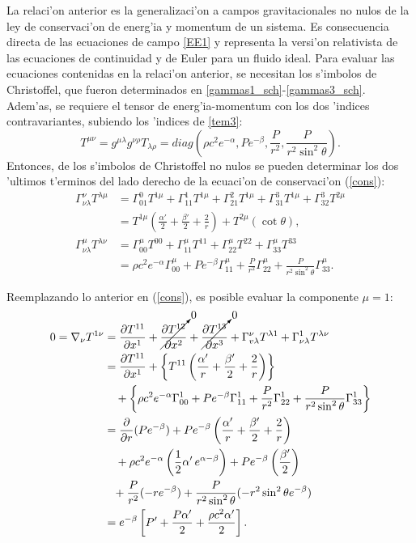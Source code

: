 La relaci'on anterior es la generalizaci'on a campos gravitacionales no nulos de la ley de conservaci'on de energ'ia y momentum de un sistema. Es consecuencia directa de las ecuaciones de campo \eqref{EE1} y representa la versi'on relativista de las ecuaciones de continuidad y de Euler para un fluido ideal. Para evaluar las ecuaciones contenidas en la relaci'on anterior, se necesitan los s'imbolos de Christoffel, que fueron determinados en \eqref{gammas1_sch}-\eqref{gammas3_sch}. Adem'as, se requiere el tensor de energ'ia-momentum con los dos 'indices contravariantes, subiendo los 'indices de \eqref{tem3}:
\begin{equation}
 T^{\mu\nu}=g^{\mu\lambda}g^{\nu\rho}T_{\lambda\rho}=diag\left(\rho c^2 e^{-\alpha},P e^{-\beta},\frac{P}{r^2}, \frac{P}{r^2\sin^2\theta}\right).
\end{equation}
Entonces, de los s'imbolos de Christoffel no nulos se pueden determinar los dos 'ultimos t'erminos del lado derecho de la ecuaci'on de conservaci'on (\ref{cons}):
\begin{align}
 \Gamma^{\nu}_{\nu\lambda}T^{\lambda\mu}&=\Gamma_{01}^{0}T^{1\mu}+\Gamma_{11}^{1}T^{1\mu}+\Gamma_{21}^{2}T^{1\mu}+\Gamma_{31}^3T^{1\mu}+\Gamma_{32}^3T^{2\mu}\\&=T^{1\mu}\left(\frac{\alpha'}{2}+\frac{\beta'}{2}+\frac{2}{r}\right)+T^{2\mu}(\cot\theta),\\
\Gamma^{\mu}_{\nu\lambda}T^{\lambda\nu}&=\Gamma_{00}^{\mu}T^{00}+\Gamma_{11}^{\mu}T^{11}+\Gamma_{22}^{\mu}T^{22}+\Gamma_{33}^{\mu}T^{33}\\&=\rho c^2e^{-\alpha}\Gamma^{\mu}_{00}+Pe^{-\beta}\Gamma^{\mu}_{11}+\frac{P}{r^2}\Gamma^{\mu}_{22}+\frac{P}{r^2\sin^2\theta}\Gamma^{\mu}_{33}.
\end{align}

Reemplazando lo anterior en (\ref{cons}), es posible evaluar la componente $\mu=1$:
\begin{align}
 0=\nabla_{\nu}T^{1\nu}&=\frac{\partial T^{11}}{\partial x^1}+\cancelto{0}{\frac{\partial T^{12}}{\partial x^2}}+\cancelto{0}{\frac{\partial T^{13}}{\partial x^3}}+\Gamma_{v\lambda}^{\nu}T^{\lambda1}+\Gamma_{\nu\lambda}^{1}T^{\lambda\nu}\\
&=\frac{\partial T^{11}}{\partial x^1}+\left\{T^{11}\left(\frac{\alpha'}{r}+\frac{\beta'}{2}+\frac{2}{r}\right)\right\} \nonumber\\
&\quad+\left\{\rho c^2 e^{-\alpha}\Gamma^{1}_{00}+Pe^{-\beta}\Gamma^{1}_{11}+\frac{P}{r^2}\Gamma^{1}_{22}+\frac{P}{r^2\sin^2\theta}\Gamma^{1}_{33}\right\}\\
&=\frac{\partial}{\partial r}(Pe^{-\beta})+Pe^{-\beta}\left(\frac{\alpha'}{r}+\frac{\beta'}{2}+\frac{2}{r}\right) \nonumber\\
&\quad+\rho c^2 e^{-\alpha}\left(\frac{1}{2}\alpha'\, e^{\alpha-\beta}\right)+Pe^{-\beta}\left(\frac{\beta'}{2}\right) \nonumber\\
&\phantom{+}+\frac{P}{r^2}(-re^{-\beta})+\frac{P}{r^2\sin^2\theta}(-r^2\sin^2\theta e^{-\beta})\\
&=e^{-\beta}\left[P'+\frac{P\alpha'}{2}+\frac{\rho c^2 \alpha'}{2}\right].
\end{align}

